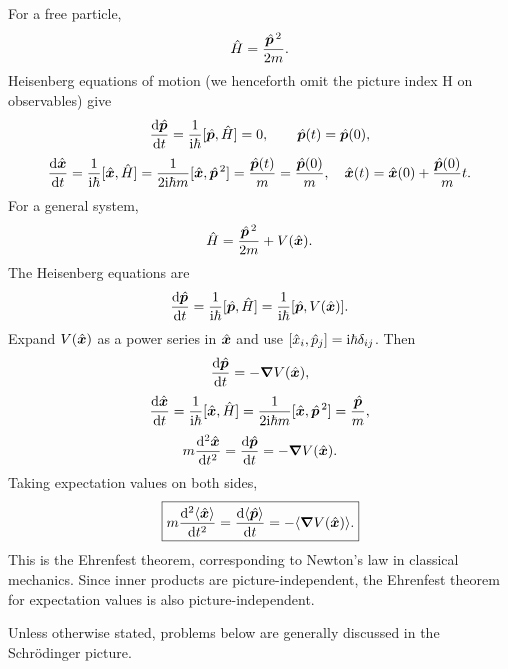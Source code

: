 For a free particle,
\begin{equation}
\hat{H}=\frac{\hat{\bm{p}}^{\,2}}{2m}.
\end{equation}
Heisenberg equations of motion (we henceforth omit the picture index H on observables) give
\begin{equation}
\frac{\mathrm{d}\hat{\bm{p}}}{\mathrm{d} t}=
\frac1{\mathrm{i}\hbar}[\hat{\bm{p}},\hat{H}]=0,\qquad
\hat{\bm{p}}(t)=\hat{\bm{p}}(0),
\end{equation}
\begin{equation}
\frac{\mathrm{d}\hat{\bm{x}}}{\mathrm{d} t}=\frac1{\mathrm{i}\hbar}[\hat{\bm{x}},\hat{H}]
=\frac1{2\mathrm{i}\hbar m}[\hat{\bm{x}},\hat{\bm{p}}^{\,2}]
=\frac{\hat{\bm{p}}(t)}m=\frac{\hat{\bm{p}}(0)}m,\quad
\hat{\bm{x}}(t)=\hat{\bm{x}}(0)+\frac{\hat{\bm{p}}(0)}m t.
\end{equation}
For a general system,
\begin{equation}
\hat{H}=\frac{\hat{\bm{p}}^{\,2}}{2m}+V(\hat{\bm{x}}).
\end{equation}
The Heisenberg equations are
\begin{equation}
\frac{\mathrm{d}\hat{\bm{p}}}{\mathrm{d} t}=
\frac1{\mathrm{i}\hbar}[\hat{\bm{p}},\hat{H}]
=\frac1{\mathrm{i}\hbar}[\hat{\bm{p}},V(\hat{\bm{x}})].
\end{equation}
Expand $V(\hat{\bm{x}})$ as a power series in $\hat{\bm{x}}$ and use $[\hat{x}_i,\hat{p}_j]=\mathrm{i}\hbar\delta_{ij}$. Then
\begin{equation}
\frac{\mathrm{d}\hat{\bm{p}}}{\mathrm{d} t}=-\bm{\nabla} V(\hat{\bm{x}}),
\end{equation}
\begin{equation}
\frac{\mathrm{d}\hat{\bm{x}}}{\mathrm{d} t}
=\frac1{\mathrm{i}\hbar}[\hat{\bm{x}},\hat{H}]
=\frac1{2\mathrm{i}\hbar m}[\hat{\bm{x}},\hat{\bm{p}}^{\,2}]
=\frac{\hat{\bm{p}}}m,
\end{equation}
\begin{equation}
m\frac{\mathrm{d}^2\hat{\bm{x}}}{\mathrm{d} t^2}
=\frac{\mathrm{d}\hat{\bm{p}}}{\mathrm{d} t}=-\bm{\nabla} V(\hat{\bm{x}}).
\end{equation}
Taking expectation values on both sides,
\begin{equation}
\boxed{m\frac{\mathrm{d}^2\langle\hat{\bm{x}}\rangle}{\mathrm{d} t^2}
=\frac{\mathrm{d}\langle\hat{\bm{p}}\rangle}{\mathrm{d} t}
=-\langle\bm{\nabla} V(\hat{\bm{x}})\rangle.}
\end{equation}
This is the Ehrenfest theorem, corresponding to Newton's law in classical mechanics. Since inner products are picture-independent, the Ehrenfest theorem for expectation values is also picture-independent.

Unless otherwise stated, problems below are generally discussed in the Schr\"odinger picture.